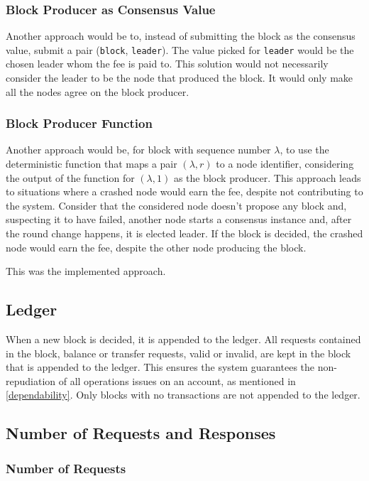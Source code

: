 \documentclass[letterpaper,twocolumn,10pt]{article}
\begin{document}
\subsubsection{Block Producer as Consensus Value}

Another approach would be to, instead of submitting the block as the consensus value, submit a pair (\texttt{block}, \texttt{leader}). The value picked for \texttt{leader} would be the chosen leader whom the fee is paid to. This solution would not necessarily consider the leader to be the node that produced the block. It would only make all the nodes agree on the block producer.

\subsubsection{Block Producer Function}

Another approach would be, for block with sequence number $\lambda$, to use the deterministic function that maps a pair $(\lambda, r)$ to a node identifier, considering the output of the function for $(\lambda, 1)$ as the block producer. This approach leads to situations where a crashed node would earn the fee, despite not contributing to the system. Consider that the considered node doesn't propose any block and, suspecting it to have failed, another node starts a consensus instance and, after the round change happens, it is elected leader. If the block is decided, the crashed node would earn the fee, despite the other node producing the block.

This was the implemented approach.

\subsection{Ledger}

When a new block is decided, it is appended to the ledger. All requests contained in the block, balance or transfer requests, valid or invalid, are kept in the block that is appended to the ledger. This ensures the system guarantees the non-repudiation of all operations issues on an account, as mentioned in \ref{dependability}. Only blocks with no transactions are not appended to the ledger.

\subsection{Number of Requests and Responses}

\subsubsection{Number of Requests}
\end{document}
